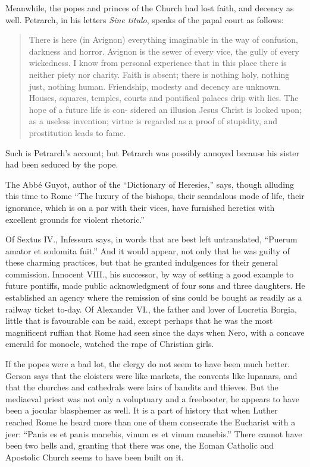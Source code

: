 \documentclass[]{book}
\begin{document}
Meanwhile, the popes and princes of the Church had lost faith, and
decency as well. Petrarch, in his letters \emph{Sine titulo}, speaks of
the papal court as follows:

\begin{quote}
There is here (in Avignon) everything imaginable in the way of
confusion, darkness and horror. Avignon is the sewer of every vice, the
gully of every wickedness. I know from personal experience that in this
place there is neither piety nor charity. Faith is absent; there is
nothing holy, nothing just, nothing human. Friendship, modesty and
decency are unknown. Houses, squares, temples, courts and pontifical
palaces drip with lies. The hope of a future life is con- sidered an
illusion Jesus Christ is looked upon; as a useless invention; virtue is
regarded as a proof of stupidity, and prostitution leads to fame.
\end{quote}

Such is Petrarch's account; but Petrarch was possibly annoyed because
his sister had been seduced by the pope.

The Abbé Guyot, author of the ``Dictionary of Heresies,'' says, though
alluding this time to Rome ``The luxury of the bishops, their scandalous
mode of life, their ignorance, which is on a par with their vices, have
furnished heretics with excellent grounds for violent rhetoric.''

Of Sextus IV., Infessura says, in words that are best left untranslated,
``Puerum amator et sodomita fuit.'' And it would appear, not only that
he was guilty of these charming practices, but that he granted
indulgences for their general commission. Innocent VIII., his successor,
by way of setting a good example to future pontiffs, made public
acknowledgment of four sons and three daughters. He established an
agency where the remission of sins could be bought as readily as a
railway ticket to-day. Of Alexander VI., the father and lover of
Lucretia Borgia, little that is favourable can be said, except perhaps
that he was the most magnificent ruffian that Rome had seen since the
days when Nero, with a concave emerald for monocle, watched the rape of
Christian girls.

If the popes were a bad lot, the clergy do not seem to have been much
better. Gerson says that the cloisters were like markets, the convents
like lupanars, and that the churches and cathedrals were lairs of
bandits and thieves. But the mediaeval priest was not only a voluptuary
and a freebooter, he appears to have been a jocular blasphemer as well.
It is a part of history that when Luther reached Rome he heard more than
one of them consecrate the Eucharist with a jeer: ``Panis es et panis
manebis, vinum es et vinum manebis.'' There cannot have been two hells
and, granting that there was one, the Eoman Catholic and Apostolic
Church seems to have been built on it.
\end{document}
